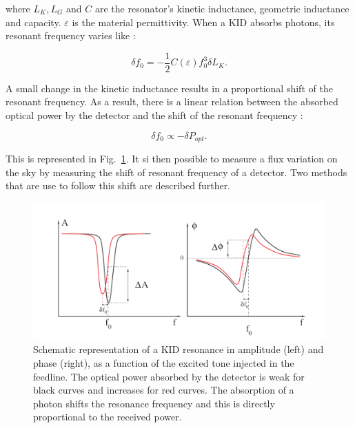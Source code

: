 where $L_{K}, L_{G}$ and $C$ are the resonator's kinetic inductance, geometric inductance and capacity. $\varepsilon$ is the material permittivity.
When a KID absorbs photons, its resonant frequency varies like :

\begin{equation}
\delta f_{0} = -\frac{1}{2}C(\varepsilon)f_{0}^{3} \delta L_{K}.
\end{equation}

A small change in the kinetic inductance results in a proportional shift of the resonant frequency. As a result, there is a linear relation between the absorbed optical power by the detector and the shift of the resonant frequency :

\begin{equation}
\delta f_{0} \propto -\delta P_{opt}.
\end{equation}

This is represented in Fig.~\ref{fig:resonance}. It si then possible to measure a flux variation on the sky by measuring the shift of resonant frequency of a detector. Two methods that are use to follow this shift are described further.

\begin{figure}
  \includegraphics[clip, angle=0, width=\columnwidth]{Figures/resonance.png}
  \caption{Schematic representation of a KID resonance in amplitude (left) and phase (right), as a function of the excited tone injected in the feedline. The optical power absorbed by the detector is weak for black curves and increases for red curves. The absorption of a photon shifts the resonance frequency and this is directly proportional to the received power.}
  \label{fig:resonance}
\end{figure}


